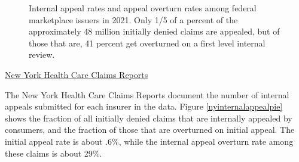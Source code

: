 \documentclass[12pt, a4paper,twoside,parskip=full]{report}
\theoremstyle{plain} %
\theoremstyle{definition} %
\theoremstyle{remark} %
\numberwithin{equation}{chapter}
\begin{document}
\begin{figure}[h!]
\begin{subfigure}[b]{0.49\textwidth}
		\end{subfigure}
		\caption{Internal appeal rates and appeal overturn rates among federal marketplace issuers in 2021. Only 1/5 of a percent of the approximately 48 million initially denied claims are appealed, but of those that are, 41 percent get overturned on a first level internal review.}
		\label{federalinternalappealpie}
	\end{figure}
	
		\clearpage
	
		\underline{New York Health Care Claims Reports}
		
		The New York Health Care Claims Reports document the number of internal appeals submitted for each insurer in the data. Figure \ref{nyinternalappealpie} shows the fraction of all initially denied claims that are internally appealed by consumers, and the fraction of those that are overturned on initial appeal. The initial appeal rate is about .6\%, while the internal appeal overturn rate among these claims is about 29\%.
		
\end{document}
